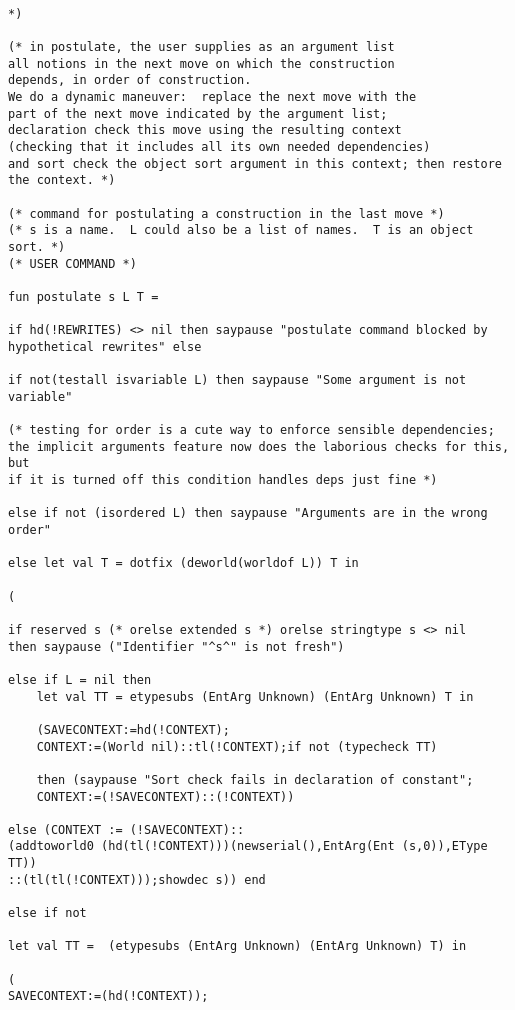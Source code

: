 \documentclass{article}
\begin{document}
\begin{verbatim}

*)

(* in postulate, the user supplies as an argument list
all notions in the next move on which the construction
depends, in order of construction.
We do a dynamic maneuver:  replace the next move with the 
part of the next move indicated by the argument list;
declaration check this move using the resulting context 
(checking that it includes all its own needed dependencies)
and sort check the object sort argument in this context; then restore the context. *)

(* command for postulating a construction in the last move *)
(* s is a name.  L could also be a list of names.  T is an object sort. *)
(* USER COMMAND *)

fun postulate s L T = 

if hd(!REWRITES) <> nil then saypause "postulate command blocked by hypothetical rewrites" else

if not(testall isvariable L) then saypause "Some argument is not variable"

(* testing for order is a cute way to enforce sensible dependencies;
the implicit arguments feature now does the laborious checks for this, but
if it is turned off this condition handles deps just fine *)

else if not (isordered L) then saypause "Arguments are in the wrong order"

else let val T = dotfix (deworld(worldof L)) T in

(

if reserved s (* orelse extended s *) orelse stringtype s <> nil 
then saypause ("Identifier "^s^" is not fresh")

else if L = nil then 
    let val TT = etypesubs (EntArg Unknown) (EntArg Unknown) T in

    (SAVECONTEXT:=hd(!CONTEXT); 
    CONTEXT:=(World nil)::tl(!CONTEXT);if not (typecheck TT) 

    then (saypause "Sort check fails in declaration of constant";
    CONTEXT:=(!SAVECONTEXT)::(!CONTEXT))
   
else (CONTEXT := (!SAVECONTEXT)::
(addtoworld0 (hd(tl(!CONTEXT)))(newserial(),EntArg(Ent (s,0)),EType TT))
::(tl(tl(!CONTEXT)));showdec s)) end

else if not 

let val TT =  (etypesubs (EntArg Unknown) (EntArg Unknown) T) in

(
SAVECONTEXT:=(hd(!CONTEXT)); 


\end{verbatim}
\end{document}
